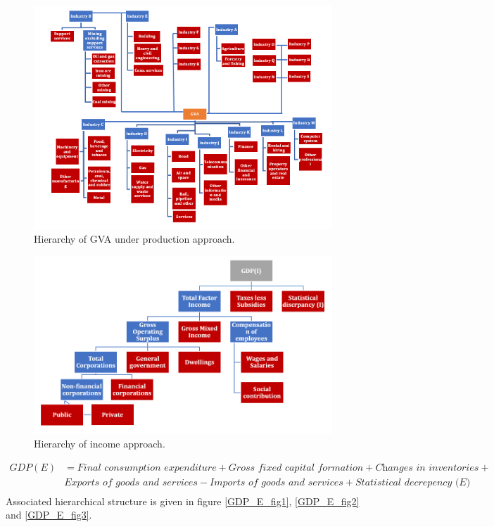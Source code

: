 \documentclass[graybox]{svmult}
\begin{document}
\begin{figure}[H]
	\centering
	\small
	\includegraphics[scale=1]{Figs/GDP_P_fig2.PNG}
	\caption{Hierarchy of GVA under production approach.}\label{GDP_P_fig2}
\end{figure}

\begin{figure}[H]
	\centering
	\small
	\includegraphics[scale=0.65]{Figs/GDP_I_fig1.PNG}
	\caption{Hierarchy of income approach.}\label{GDP_I_fig1}
\end{figure}

\begin{align*}
GDP(E) &= \textit{Final consumption expenditure} + \textit{Gross fixed capital formation} + \textit{Changes in inventories} +\\ &\textit{Exports of goods and services} - \textit{Imports of goods and services} + \textit{Statistical decrepency (E)}\\
\end{align*}
Associated hierarchical structure is given in figure \ref{GDP_E_fig1}, \ref{GDP_E_fig2} and \ref{GDP_E_fig3}.
\end{document}
